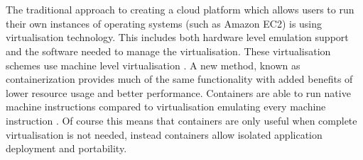 \documentclass[prodmode,acmtecs]{acmsmall}
\begin{document}
\\
\\
The traditional approach to creating a cloud platform which allows users to run their own instances of operating systems (such as Amazon EC2) is using virtualisation technology. This includes both hardware level emulation support and the software needed to manage the virtualisation. These virtualisation schemes use machine level virtualisation \cite{fink2014docker}. A new method, known as containerization provides much of the same functionality with added benefits of lower resource usage and better performance. Containers are able to run native machine instructions compared to virtualisation emulating every machine instruction \cite{dua2014virtualization}. Of course this means that containers are only useful when complete virtualisation is not needed, instead containers allow isolated application deployment and portability.

\appendix


\end{document}
